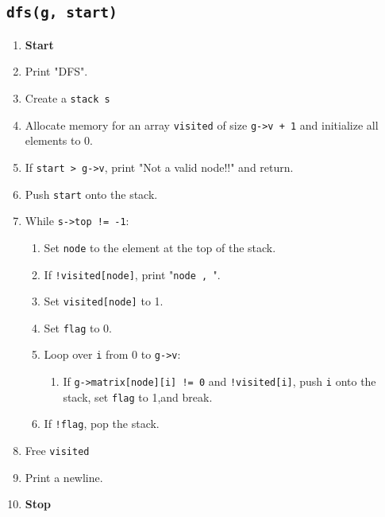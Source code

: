 {  \subsection{\texttt{dfs(g, start)}}
  \begin{enumerate}[label=\arabic*:,left=0pt]
    \item \textbf{Start}
    \item Print "DFS".
    \item Create a \texttt{stack}\ \texttt{s}
    \item Allocate memory for an array \texttt{visited} of size \texttt{g->v + 1} and initialize all elements to 0.
    \item If \texttt{start > g->v}, print "Not a valid node!!" and return.
    \item Push \texttt{start} onto the stack.
    \item While \texttt{s->top != -1}:
          \begin{enumerate}[label=7.\arabic*:, start=1]
            \item Set \texttt{node} to the element at the top of the stack.
            \item If \texttt{!visited[node]}, print "\texttt{node , }".
            \item Set \texttt{visited[node]} to 1.
            \item Set \texttt{flag} to 0.
            \item Loop over \texttt{i} from 0 to \texttt{g->v}:
                  \begin{enumerate}[label=7.5.\arabic*:, start=1]
                    \item If \texttt{g->matrix[node][i] != 0} and \texttt{!visited[i]}, push \texttt{i} onto the stack, set \texttt{flag} to 1,\newline and break.
                  \end{enumerate}
            \item If \texttt{!flag}, pop the stack.
          \end{enumerate}
    \item Free \texttt{visited}
    \item Print a newline.
    \item \textbf{Stop}
  \end{enumerate}

}
